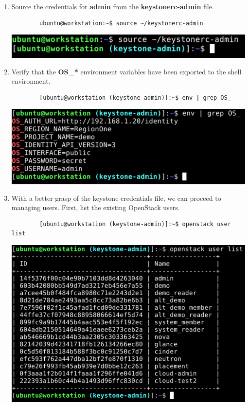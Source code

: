 \documentclass[letterpaper, 12pt]{article}
\begin{document}
\begin{enumerate}
    \item Source the credentials for \textbf{admin} from the \textbf{keystonerc-admin} file.
    \begin{lstlisting}
        ubuntu@workstation:~$ source ~/keystonerc-admin
    \end{lstlisting}

    \begin{center}
        \includegraphics[width=\linewidth]{images/part4/step3.png}
    \end{center}

    \item Verify that the \textbf{OS\_*} environment variables have been exported to the shell environment.
    \begin{lstlisting}
        [ubuntu@workstation (keystone-admin)]:~$ env | grep OS_
    \end{lstlisting}

    \begin{center}
        \includegraphics[width=\linewidth]{images/part4/step4.png}
    \end{center}

    \item With a better grasp of the keystone credentials file, we can proceed to managing users.
    First, list the existing OpenStack users.
    \begin{lstlisting}
        [ubuntu@workstation (keystone-admin)]:~$ openstack user list
    \end{lstlisting}

    \begin{center}
        \includegraphics[width=\linewidth]{images/part4/step5.png}
    \end{center}


\end{enumerate}
\end{document}
